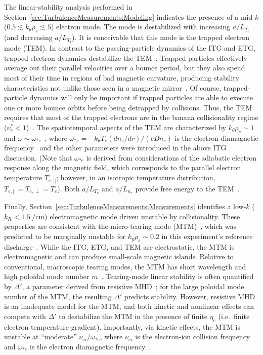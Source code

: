 The linear-stability analysis performed in
Section~\ref{sec:TurbulenceMeasurements:Modeling}
indicates the presence of
a mid-$k$ ($0.5 \lesssim k_{\theta} \rho_s \lesssim 5$) electron mode.
The mode is destabilized with
increasing $a / L_{T_e}$ (and decreasing $a / L_{T_i}$).
It is conceivable that this mode is
the trapped electron mode (TEM).
In contrast to the passing-particle dynamics of the ITG and ETG,
trapped-electron dynamics destabilize the TEM~\cite[Sec.~8.4]{wesson}.
Trapped particles effectively average out their parallel velocities
over a bounce period, but
they also spend most of their time
in regions of bad magnetic curvature,
producing stability characteristics
not unlike those seen in a magnetic mirror~\cite[Sec.~8.4]{wesson}.
Of course, trapped-particle dynamics
will only be important if
trapped particles are able to execute one or more bounce orbits
before being detrapped by collisions.
Thus, the TEM requires that most of the trapped electrons
are in the banana collisionality regime
($\nu_e^* < 1$)~\cite[Sec.~2.3.4.3]{fusion_physics_iaea}.
The spatiotemporal aspects of the TEM are characterized by
$k_{\theta} \rho_s \sim 1$ and
$\omega \sim \omega_{*e}$~\cite[Sec.~2.3.1]{fusion_physics_iaea},
where $\omega_{*e} = -k_{\theta} T_e (dn_e / dr) / (e B n_e)$
is the electron diamagnetic frequency~\cite[8.2]{wesson} and
the other parameters were introduced in the above ITG discussion.
(Note that $\omega_{*e}$ is derived from considerations
of the adiabatic electron response along the magnetic field,
which corresponds to the parallel electron temperature $T_{e,||}$;
however, in an isotropic temperature distribution,
$T_{e,||} = T_{e,\perp} = T_e$).
Both $a / L_{T_e}$ and $a / L_{n_e}$
provide free energy to the TEM~\cite[Sec.~2.3.1]{fusion_physics_iaea}.

Finally, Section~\ref{sec:TurbulenceMeasurements:Measurements}
identifies a low-$k$ ($k_R < \SI{1.5}{\per\centi\meter}$)
electromagnetic mode driven unstable by collisionality.
These properties are consistent with
the micro-tearing mode (MTM)~\cite[Sec.~8.5]{wesson},
which was predicted to be marginally unstable
for $k_y \rho_s \sim 0.2$
in this experiment's reference discharge~\cite{holland_nf17}.
While the ITG, ETG, and TEM are electrostatic,
the MTM is electromagnetic and
can produce small-scale magnetic islands.
Relative to conventional, macroscopic tearing modes,
the MTM has short wavelength and
high poloidal mode number $m$~\cite[Sec.~8.5]{wesson}.
Tearing-mode linear stability is often quantified by $\Delta'$,
a parameter derived from resistive MHD~\cite[Sec.~7.3]{wesson};
for the large poloidal mode number of the MTM,
the resulting $\Delta'$ predicts stability.
However, resistive MHD is an inadequate model for the MTM, and
both kinetic and nonlinear effects can compete with $\Delta'$
to destabilize the MTM in the presence of finite $\eta_e$
(i.e.\ finite electron temperature gradient).
Importantly, via kinetic effects, the MTM is unstable
at ``moderate'' $\nu_{ei} / \omega_{*e}$, where
$\nu_{ei}$ is the electron-ion collision frequency and
$\omega_{*e}$ is the electron diamagnetic frequency~\cite[Sec.~8.5]{wesson}.


